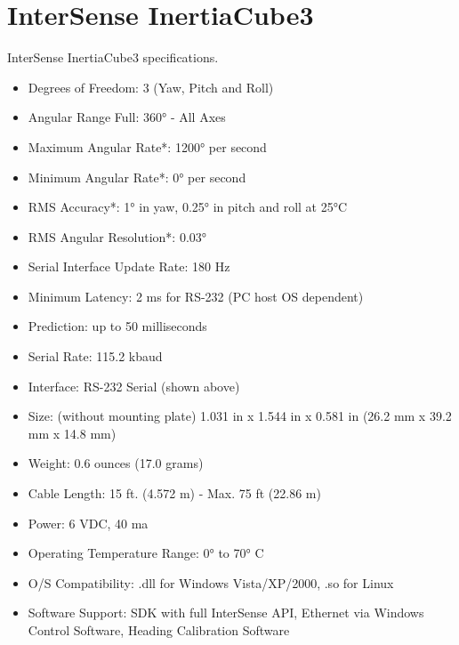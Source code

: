 \chapter{InterSense InertiaCube3}
\label{AppendixC}

InterSense InertiaCube3 specifications.

\begin{itemize}
\item Degrees of Freedom: 3 (Yaw, Pitch and Roll) 
\item Angular Range Full: 360° - All Axes 
\item Maximum Angular Rate*: 1200° per second 
\item Minimum Angular Rate*: 0° per second 
\item RMS Accuracy*: 1° in yaw, 0.25° in pitch and roll at 25°C 
\item RMS Angular Resolution*: 0.03° 
\item Serial Interface Update Rate: 180 Hz 
\item Minimum Latency: 2 ms for RS-232 (PC host OS dependent) 
\item Prediction: up to 50 milliseconds 
\item Serial Rate: 115.2 kbaud 
\item Interface: RS-232 Serial (shown above) 
\item Size: (without mounting plate) 1.031 in x 1.544 in x 0.581 in (26.2 mm x 39.2 mm x 14.8 mm) 
\item Weight: 0.6 ounces (17.0 grams) 
\item Cable Length: 15 ft. (4.572 m) - Max. 75 ft (22.86 m) 
\item Power: 6 VDC, 40 ma 
\item Operating Temperature Range: 0° to 70° C 
\item O/S Compatibility: .dll for Windows Vista/XP/2000, .so for Linux 
\item Software Support: SDK with full InterSense API, Ethernet via Windows Control Software, Heading Calibration Software
\end{itemize}
